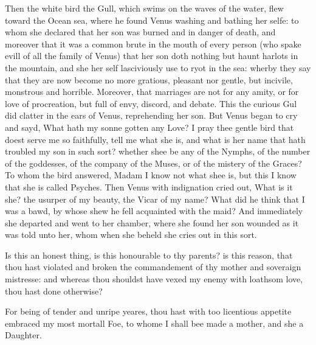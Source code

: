 Then the white bird the Gull, which swims on the waves of the water, flew
toward the Ocean sea, where he found Venus washing and bathing her selfe: to
whom she declared that her son was burned and in danger of death, and moreover
that it was a common brute in the mouth of every person (who spake evill of all
the family of Venus) that her son doth nothing but haunt harlots in the
mountain, and she her self lasciviously use to ryot in the sea: wherby they say
that they are now become no more gratious, pleasant nor gentle, but incivile,
monstrous and horrible. Moreover, that marriages are not for any amity, or for
love of procreation, but full of envy, discord, and debate. This the curious
Gul did clatter in the ears of Venus, reprehending her son. But Venus began to
cry and sayd, What hath my sonne gotten any Love? I pray thee gentle bird that
doest serve me so faithfully, tell me what she is, and what is her name that
hath troubled my son in such sort? whether shee be any of the Nymphs, of the
number of the goddesses, of the company of the Muses, or of the mistery of the
Graces? To whom the bird answered, Madam I know not what shee is, but this I
know that she is called Psyches. Then Venus with indignation cried out, What is
it she? the usurper of my beauty, the Vicar of my name? What did he think that
I was a bawd, by whose shew he fell acquainted with the maid? And immediately
she departed and went to her chamber, where she found her son wounded as it was
told unto her, whom when she beheld she cries out in this sort.

Is this an honest thing, is this honourable to thy parents? is this reason,
that thou hast violated and broken the commandement of thy mother and soveraign
mistresse: and whereas thou shouldst have vexed my enemy with loathsom love,
thou hast done otherwise?

For being of tender and unripe yeares, thou hast with too licentious appetite
embraced my most mortall Foe, to whome I shall bee made a mother, and she a
Daughter.

